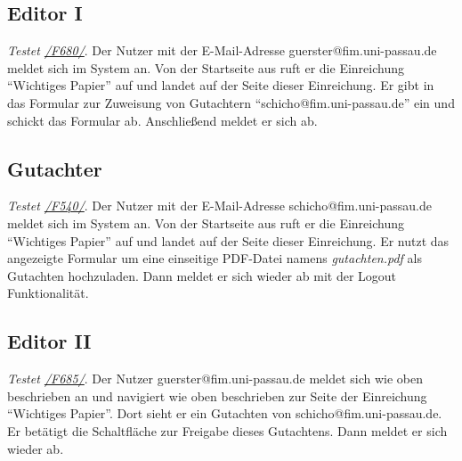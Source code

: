 \subsection{Editor I}
\begin{description}

	 \emph{Testet \hyperref[funkt:680]{/F680/}}.
	Der Nutzer mit der E-Mail-Adresse guerster@fim.uni-passau.de meldet sich im System an.
	Von der Startseite aus ruft er die Einreichung ``Wichtiges Papier'' auf und landet auf der Seite dieser Einreichung.
	Er gibt in das Formular zur Zuweisung von Gutachtern ``schicho@fim.uni-passau.de'' ein und schickt das Formular ab.
	Anschließend meldet er sich ab.



\end{description}

\subsection{Gutachter}
\begin{description}

	 \emph{Testet \hyperref[funkt:540]{/F540/}}.
	Der Nutzer mit der E-Mail-Adresse schicho@fim.uni-passau.de meldet sich im System an.
	Von der Startseite aus ruft er die Einreichung ``Wichtiges Papier'' auf und landet auf der Seite dieser Einreichung.
	Er nutzt das angezeigte Formular um eine einseitige PDF-Datei namens \emph{gutachten.pdf} als Gutachten hochzuladen.
	Dann meldet er sich wieder ab mit der Logout Funktionalität.

\end{description}

\subsection{Editor II}
\begin{description}

	 \emph{Testet \hyperref[funkt:685]{/F685/}}.
	Der Nutzer guerster@fim.uni-passau.de meldet sich wie oben beschrieben an und navigiert wie oben beschrieben zur Seite der Einreichung ``Wichtiges Papier''.
	Dort sieht er ein Gutachten von schicho@fim.uni-passau.de.
	Er betätigt die Schaltfläche zur Freigabe dieses Gutachtens.
	Dann meldet er sich wieder ab.

\end{description}

